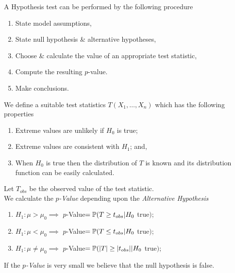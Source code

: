 \documentclass[11pt,a4paper]{article}
\begin{document}
A Hypothesis test can be performed by the following procedure
\begin{enumerate}[label=\roman*)]
	\item State model assumptions,
	\item State null hypothesis \& alternative hypotheses,
	\item Choose \& calculate the value of an appropriate test statistic,
	\item Compute the resulting $p$-value.
	\item Make conclusions.
\end{enumerate}

We define a suitable test statistics $T(X_1,\dots,X_n)$ which has the following properties
\begin{enumerate}[label=\roman*)]
	\item Extreme values are unlikely if $H_0$ is true;
	\item Extreme values are consistent with $H_1$; and,
	\item When $H_0$ is true then the distribution of $T$ is known and its distribution function can be easily calculated.
\end{enumerate}

Let $T_{obs}$ be the observed value of the test statistic.\\
We calculate the \textit{$p$-Value} depending upon the \textit{Alternative Hypothesis}
\begin{enumerate}[label=\roman*)]
	\item $H_1:\mu>\mu_0\implies$ $p$-Value$=\mathbb{P}(T\geq t_{obs}|H_0$ true$)$;
	\item $H_1:\mu<\mu_0\implies$ $p$-Value$=\mathbb{P}(T\leq t_{obs}|H_0$ true$)$;
	\item $H_1:\mu\neq\mu_0\implies$ $p$-Value$=\mathbb{P}(|T|\geq|t_{obs}||H_0$ true$)$;
\end{enumerate}

If the \textit{$p$-Value} is very small we believe that the null hypothesis is false.\\
\end{document}
